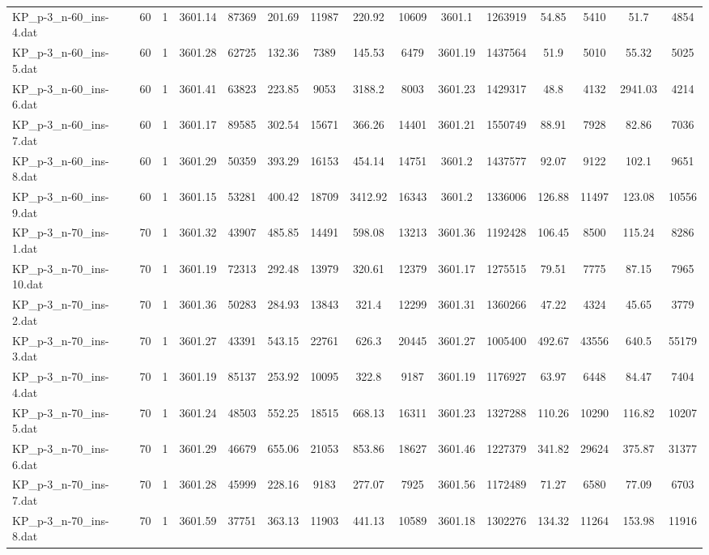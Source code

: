 \begin{table}[!ht]
{\begin{tabular}{lcccccccccccccc}
KP\_p-3\_n-60\_ins-4.dat & 60 & 1 & 3601.14 & 87369 & 201.69 & 11987 & 220.92 & 10609 & 3601.1 & 1263919 & 54.85 & 5410 & 51.7 & 4854 \\
KP\_p-3\_n-60\_ins-5.dat & 60 & 1 & 3601.28 & 62725 & 132.36 & 7389 & 145.53 & 6479 & 3601.19 & 1437564 & 51.9 & 5010 & 55.32 & 5025 \\
KP\_p-3\_n-60\_ins-6.dat & 60 & 1 & 3601.41 & 63823 & 223.85 & 9053 & 3188.2 & 8003 & 3601.23 & 1429317 & 48.8 & 4132 & 2941.03 & 4214 \\
KP\_p-3\_n-60\_ins-7.dat & 60 & 1 & 3601.17 & 89585 & 302.54 & 15671 & 366.26 & 14401 & 3601.21 & 1550749 & 88.91 & 7928 & 82.86 & 7036 \\
KP\_p-3\_n-60\_ins-8.dat & 60 & 1 & 3601.29 & 50359 & 393.29 & 16153 & 454.14 & 14751 & 3601.2 & 1437577 & 92.07 & 9122 & 102.1 & 9651 \\
KP\_p-3\_n-60\_ins-9.dat & 60 & 1 & 3601.15 & 53281 & 400.42 & 18709 & 3412.92 & 16343 & 3601.2 & 1336006 & 126.88 & 11497 & 123.08 & 10556 \\
KP\_p-3\_n-70\_ins-1.dat & 70 & 1 & 3601.32 & 43907 & 485.85 & 14491 & 598.08 & 13213 & 3601.36 & 1192428 & 106.45 & 8500 & 115.24 & 8286 \\
KP\_p-3\_n-70\_ins-10.dat & 70 & 1 & 3601.19 & 72313 & 292.48 & 13979 & 320.61 & 12379 & 3601.17 & 1275515 & 79.51 & 7775 & 87.15 & 7965 \\
KP\_p-3\_n-70\_ins-2.dat & 70 & 1 & 3601.36 & 50283 & 284.93 & 13843 & 321.4 & 12299 & 3601.31 & 1360266 & 47.22 & 4324 & 45.65 & 3779 \\
KP\_p-3\_n-70\_ins-3.dat & 70 & 1 & 3601.27 & 43391 & 543.15 & 22761 & 626.3 & 20445 & 3601.27 & 1005400 & 492.67 & 43556 & 640.5 & 55179 \\
KP\_p-3\_n-70\_ins-4.dat & 70 & 1 & 3601.19 & 85137 & 253.92 & 10095 & 322.8 & 9187 & 3601.19 & 1176927 & 63.97 & 6448 & 84.47 & 7404 \\
KP\_p-3\_n-70\_ins-5.dat & 70 & 1 & 3601.24 & 48503 & 552.25 & 18515 & 668.13 & 16311 & 3601.23 & 1327288 & 110.26 & 10290 & 116.82 & 10207 \\
KP\_p-3\_n-70\_ins-6.dat & 70 & 1 & 3601.29 & 46679 & 655.06 & 21053 & 853.86 & 18627 & 3601.46 & 1227379 & 341.82 & 29624 & 375.87 & 31377 \\
KP\_p-3\_n-70\_ins-7.dat & 70 & 1 & 3601.28 & 45999 & 228.16 & 9183 & 277.07 & 7925 & 3601.56 & 1172489 & 71.27 & 6580 & 77.09 & 6703 \\
KP\_p-3\_n-70\_ins-8.dat & 70 & 1 & 3601.59 & 37751 & 363.13 & 11903 & 441.13 & 10589 & 3601.18 & 1302276 & 134.32 & 11264 & 153.98 & 11916 \\

\end{tabular}}
\end{table}
